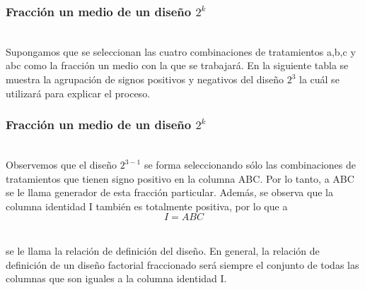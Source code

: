 \documentclass[12pt]{beamer}
\begin{document}
\begin{frame}
\frametitle{Fracción un medio de un diseño $ 2^{k} $}
~\\Supongamos que se seleccionan las cuatro combinaciones de tratamientos a,b,c y abc como la fracción un medio con la que se trabajará. En la siguiente tabla se muestra la agrupación de signos positivos y negativos del diseño $2^3$ la cuál se utilizará para explicar el proceso.
\begin{table}[htbp]
  \centering
  \label{tab:addlabel}%
\end{table}%
\end{frame}


\begin{frame}
\frametitle{Fracción un medio de un diseño $ 2^{k} $}
~\\Observemos que el diseño $2^{3-1}$ se forma seleccionando sólo las combinaciones de tratamientos que tienen signo positivo en la columna ABC. Por lo tanto, a ABC se le llama generador de esta fracción particular. Además, se observa que la columna identidad I también es totalmente positiva, por lo que a
$$I=ABC$$

~\\se le llama la relación de definición del diseño. En general, la relación de definición de un diseño factorial fraccionado será siempre el conjunto de todas las columnas que son iguales a la columna identidad I. 
\end{frame}
\end{document}
